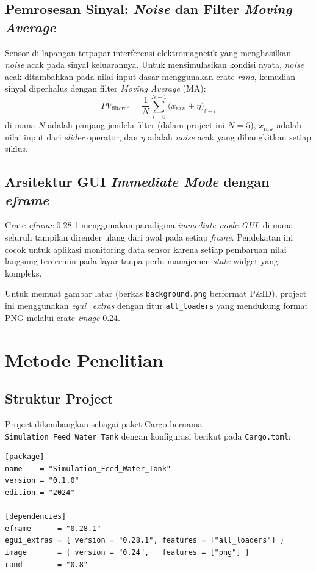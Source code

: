 \documentclass[12pt,a4paper]{article}
\begin{document}
\subsection{Pemrosesan Sinyal: \textit{Noise} dan Filter \textit{Moving Average}}
Sensor di lapangan terpapar interferensi elektromagnetik yang menghasilkan
\textit{noise} acak pada sinyal keluarannya. Untuk mensimulasikan kondisi
nyata, \textit{noise} acak ditambahkan pada nilai input dasar menggunakan
crate \textit{rand}, kemudian sinyal diperhalus dengan filter
\textit{Moving Average} (MA):
\begin{equation}
    PV_{\text{filtered}} = \frac{1}{N}
    \sum_{i=0}^{N-1} \bigl(x_{\text{raw}} + \eta\bigr)_{t-i}
\end{equation}
di mana $N$ adalah panjang jendela filter (dalam project ini $N=5$),
$x_{\text{raw}}$ adalah nilai input dari \textit{slider} operator, dan
$\eta$ adalah \textit{noise} acak yang dibangkitkan setiap siklus.

\subsection{Arsitektur GUI \textit{Immediate Mode} dengan \textit{eframe}}
Crate \textit{eframe} 0.28.1 menggunakan paradigma \textit{immediate mode
GUI}, di mana seluruh tampilan dirender ulang dari awal pada setiap
\textit{frame}. Pendekatan ini cocok untuk aplikasi monitoring data sensor
karena setiap pembaruan nilai langsung tercermin pada layar tanpa perlu
manajemen \textit{state} widget yang kompleks.

Untuk memuat gambar latar (berkas \texttt{background.png} berformat P\&ID),
project ini menggunakan \textit{egui\_extras} dengan fitur
\texttt{all\_loaders} yang mendukung format PNG melalui crate
\textit{image} 0.24.

\section{Metode Penelitian}

\subsection{Struktur Project}
Project dikembangkan sebagai paket Cargo bernama
\texttt{Simulation\_Feed\_Water\_Tank} dengan konfigurasi berikut pada
\texttt{Cargo.toml}:

\begin{lstlisting}[language={},caption={Konfigurasi Cargo.toml}]
[package]
name    = "Simulation_Feed_Water_Tank"
version = "0.1.0"
edition = "2024"

[dependencies]
eframe      = "0.28.1"
egui_extras = { version = "0.28.1", features = ["all_loaders"] }
image       = { version = "0.24",   features = ["png"] }
rand        = "0.8"
\end{lstlisting}
\end{document}
